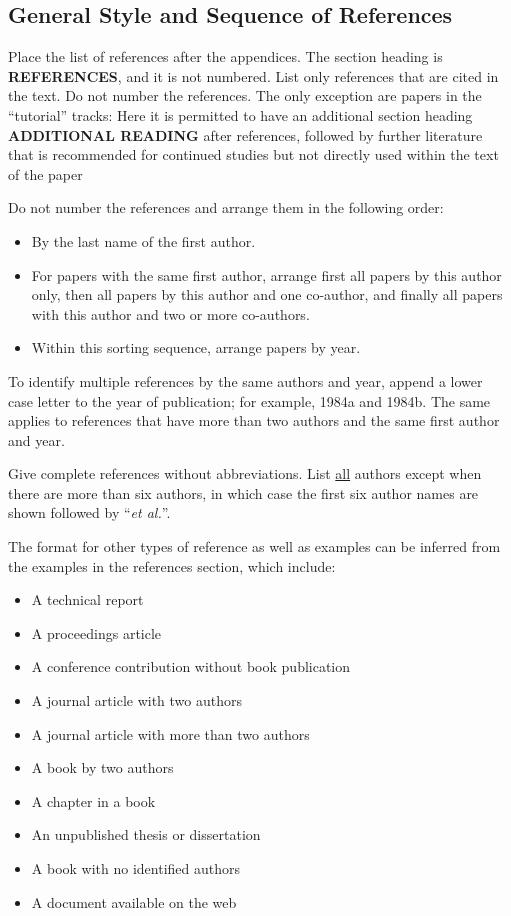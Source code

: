 \documentclass{wscpaperproc}
\theoremstyle{wsc}
\begin{document}
\subsection{General Style and Sequence of References}
Place the list of references after the appendices. The section heading is {\bf REFERENCES}, and it is not numbered. List only references that are cited in the text. Do not number the references. The only exception are papers in the ``tutorial'' tracks: Here it is permitted to have an additional section heading {\bf ADDITIONAL READING} after references, followed by further literature that is recommended for continued studies but not directly used within the text of the paper

Do not number the references and arrange them in the following order:
\begin{itemize}
	\item By the last name of the first author.
	\item For papers with the same first author, arrange first all papers by this author only, then all papers by this author and one co-author, and finally all papers with this author and two or more co-authors.
\item Within this sorting sequence, arrange papers by year.
\end{itemize}

To identify multiple references by the same authors and year, append a lower case letter to the year of publication; for example, 1984a and 1984b. The same applies to references that have more than two authors and the same first author and year.

Give complete references without abbreviations. List \underline{all} authors except when there are more than six authors, in which case the first six author names are shown followed by ``\textit{et al.}''.

The format for other types of reference as well as examples can be inferred from the examples in the references section, which include:
\begin{itemize}
\item A technical report \cite{chi89}
\item A proceedings article \cite{cheng:input94}
\item A conference contribution without book publication 
\item A journal article with two authors \cite{powell2017widening}
\item A journal article with more than two authors 
\item A book by two authors \cite{hammersley:montecarlo}
\item A chapter in a book \cite{sch79}
\item An unpublished thesis or dissertation \cite{ste99}
\item A book with no identified authors \cite{chicago03}
\item A document available on the web \cite{WSC}
\end{itemize}
\end{document}
